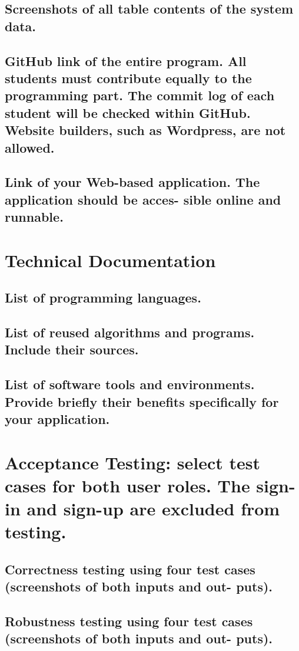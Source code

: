 \documentclass[letterpaper, 10 pt, conference]{ieeeconf}
\begin{document}
\subsection{Screenshots of all table contents of the system data.}
\subsection{GitHub link of the entire program. All students must contribute equally to the programming part. The commit log of each student will be checked within GitHub. Website builders, such as Wordpress, are not allowed.}
\subsection{Link of your Web-based application. The application should be acces- sible online and runnable.}

\section{Technical Documentation}
\subsection{List of programming languages.}
\subsection{List of reused algorithms and programs. Include their sources.}
\subsection{List of software tools and environments. Provide briefly their benefits specifically for your application.}

\section{Acceptance Testing: select test cases for both user roles. The sign-in and sign-up are excluded from testing.}
\subsection{Correctness testing using four test cases (screenshots of both inputs and out- puts).}
\subsection{Robustness testing using four test cases (screenshots of both inputs and out- puts).}
\end{document}
